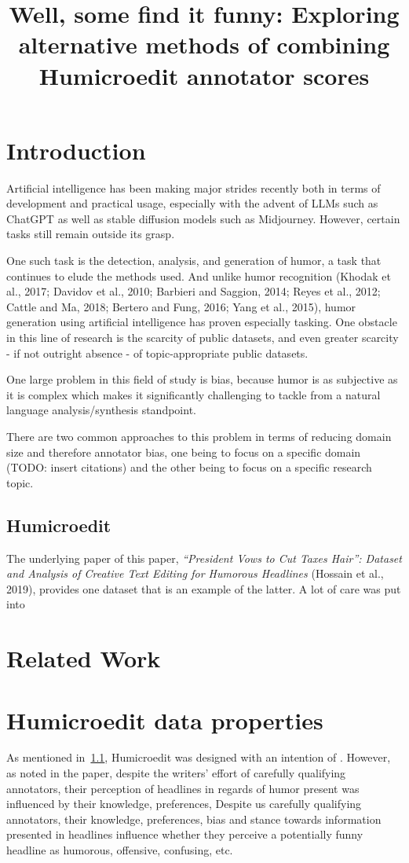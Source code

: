 \documentclass[10pt, a4paper]{article}
\title{Well, some find it funny: Exploring alternative methods of combining Humicroedit annotator scores}
\begin{document}
\maketitleabstract

\section{Introduction}

Artificial intelligence has been making major strides recently both in terms of development and practical usage, especially with the advent of LLMs such as ChatGPT as well as stable diffusion models such as Midjourney. However, certain tasks still remain outside its grasp. 

One such task is the detection, analysis, and generation of humor, a task that continues to elude the methods used. And unlike humor recognition (Khodak et al., 2017; Davidov et al., 2010; Barbieri and Saggion, 2014; Reyes et al., 2012; Cattle and Ma, 2018; Bertero and Fung, 2016; Yang et al., 2015), humor generation using artificial intelligence has proven especially tasking. One obstacle in this line of research is the scarcity of public datasets, and even greater scarcity - if not outright absence - of topic-appropriate public datasets.

One large problem in this field of study is bias, because humor is as subjective as it is complex which makes it significantly challenging to tackle from a natural language analysis/synthesis standpoint.

There are two common approaches to this problem in terms of reducing domain size and therefore annotator bias, one being to focus on a specific domain (TODO: insert citations) and the other being to focus on a specific research topic.

\subsection{Humicroedit}
\label{sec:HME}

The underlying paper of this paper, \textit{“President Vows to Cut Taxes Hair”:
Dataset and Analysis of Creative Text Editing for Humorous Headlines} (Hossain et al., 2019), provides one dataset that is an example of the latter. A lot of care was put into 

\section{Related Work}





\section{Humicroedit data properties}
As mentioned in~\ref{sec:HME}, Humicroedit was designed with an intention of . However, as noted in the paper, despite the writers' effort of carefully qualifying annotators, their perception of headlines in regards of humor present was influenced by their knowledge, preferences, 
Despite us carefully qualifying annotators, their
knowledge, preferences, bias and stance towards information presented in headlines influence whether they perceive a potentially funny
headline as humorous, offensive, confusing, etc.
\end{document}
